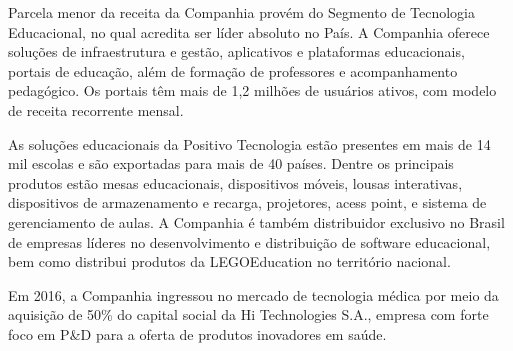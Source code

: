 Parcela menor da receita da Companhia provém do Segmento de Tecnologia Educacional, no qual acredita ser líder absoluto no País. A Companhia oferece soluções de infraestrutura e gestão, aplicativos e plataformas educacionais, portais de educação, além de formação de professores e acompanhamento pedagógico. Os portais têm mais de 1,2 milhões de usuários ativos, com modelo de receita recorrente mensal. 

As soluções educacionais da Positivo Tecnologia estão presentes em mais de 14 mil escolas e são exportadas para mais de 40 países. Dentre os principais produtos estão mesas educacionais, dispositivos móveis, lousas interativas, dispositivos de armazenamento e recarga, projetores, acess point, e sistema de gerenciamento de aulas. A Companhia é também distribuidor exclusivo no Brasil de empresas líderes no desenvolvimento e distribuição de software educacional, bem como distribui produtos da LEGO\texttrademark Education no território nacional.

Em 2016, a Companhia ingressou no mercado de tecnologia médica por meio da aquisição de 50\% do capital social da Hi Technologies S.A., empresa com forte foco em P\&D para a oferta de produtos inovadores em saúde.
